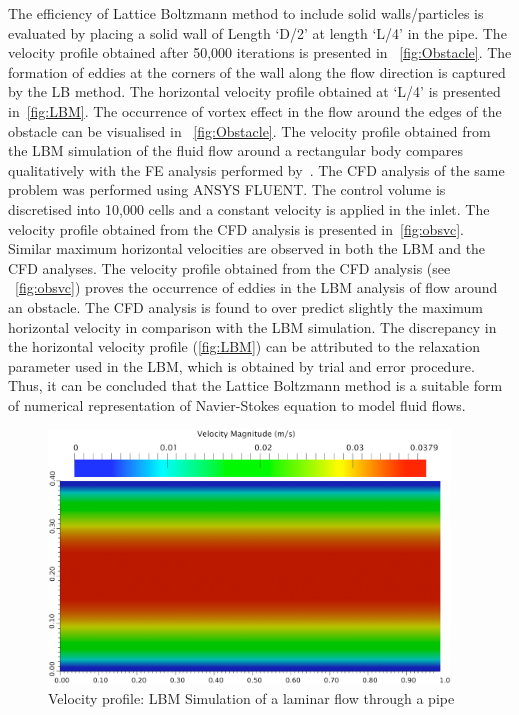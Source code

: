 The efficiency of Lattice Boltzmann method to include solid walls/particles is 
evaluated by placing a solid wall of Length `D/2' at length `L/4' in the pipe. 
The velocity profile obtained after 50,000 iterations is presented in 
~\cref{fig:Obstacle}. The formation of eddies at the corners of the wall along 
the flow direction is captured by the LB method. The horizontal velocity 
profile obtained at `L/4' is presented in~\cref{fig:LBM}. The occurrence of 
vortex effect in the flow around the edges of the obstacle can be visualised in 
~\cref{fig:Obstacle}. The velocity profile obtained from the LBM simulation of 
the fluid flow around a rectangular body compares qualitatively with the FE 
analysis performed by~\citet{Zhong1991}. The CFD analysis of the same problem 
was performed using ANSYS FLUENT. The control volume is discretised into 10,000 
cells and a constant velocity is applied in the inlet. The velocity profile 
obtained from the CFD analysis is presented in~\cref{fig:obsvc}. Similar 
maximum horizontal velocities are observed in both the LBM and the CFD 
analyses. The velocity profile obtained from the CFD analysis (see 
~\cref{fig:obsvc}) proves the occurrence of eddies in the LBM analysis of flow 
around an obstacle. The CFD analysis is found to over predict slightly the 
maximum horizontal velocity in comparison with the LBM simulation. The 
discrepancy in the horizontal velocity profile (\cref{fig:LBM}) can be 
attributed to the relaxation parameter used in the LBM, which is obtained by 
trial and error procedure. Thus, it can be concluded that the Lattice Boltzmann 
method is a suitable form of numerical representation of Navier-Stokes equation 
to model fluid flows. 

\begin{figure}[h]
\centering
\includegraphics[width=0.95\textwidth]{LBM_Poiseuille}
\caption{Velocity profile: LBM Simulation of a laminar flow through a pipe}
\label{fig:LBM_Poiseuille}
\end{figure}


